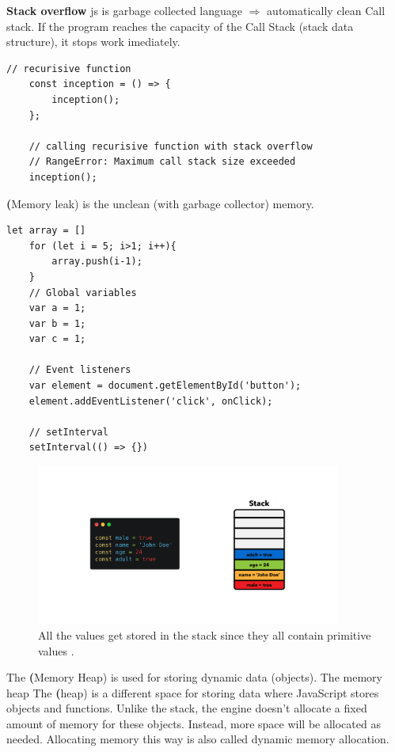         \textbf{Stack overflow} \acrshort{js} is garbage collected language $\Rightarrow$  automatically clean Call stack. 
        If the program reaches the capacity of the Call Stack (stack data structure), it stops work imediately.

         \begin{lstlisting}[style=ES6, caption={recursive function wich exceed Call stack}]
    // recurisive function
    const inception = () => {
        inception();
    };

    // calling recurisive function with stack overflow
    // RangeError: Maximum call stack size exceeded
    inception();
        \end{lstlisting}

        \textbf(Memory leak) is the unclean (with garbage collector) memory.

        \begin{lstlisting}[style=ES6, caption={Memory leak}]
    let array = []
    for (let i = 5; i>1; i++){
        array.push(i-1);
    }
    // Global variables
    var a = 1;
    var b = 1;
    var c = 1;

    // Event listeners
    var element = document.getElementById('button');
    element.addEventListener('click', onClick);

    // setInterval
    setInterval(() => {})

        \end{lstlisting}

        \begin{figure}[h]
            \begin{center}
                \includegraphics[width=10cm]{01/images/03-stack.png}
                \caption[Call stack]{All the values get stored in the stack since they all contain primitive values \cite{JavaScriptMemoryManagment2020}.}
            \end{center}
        \end{figure}

        The \textbf(Memory Heap) is used for storing dynamic data (objects).
        The memory heap The \textbf(heap) is a different space for storing data where JavaScript stores objects and functions. 
        Unlike the stack, the engine doesn't allocate a fixed amount of memory for these objects. 
        Instead, more space will be allocated as needed. 
        Allocating memory this way is also called dynamic memory allocation.

